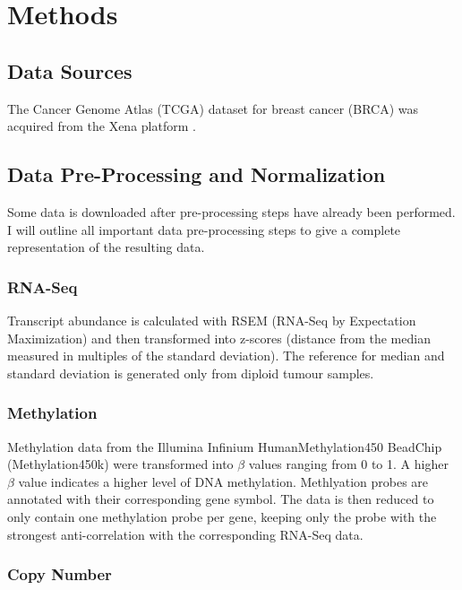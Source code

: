 \section{Methods}
\countem

\subsection{Data Sources}

The Cancer Genome Atlas (TCGA) dataset for breast cancer (BRCA)\cite{Ciriello2015} was acquired from the Xena platform \cite{Goldman2018}.

\subsection{Data Pre-Processing and Normalization}

Some data is downloaded after pre-processing steps have already been performed.
I will outline all important data pre-processing steps to give a complete representation of the resulting data.

\subsubsection*{RNA-Seq}

Transcript abundance is calculated with RSEM (RNA-Seq by Expectation Maximization) and then transformed into z-scores (distance from the median measured in multiples of the standard deviation).
The reference for median and standard deviation is generated only from diploid tumour samples.

\subsubsection*{Methylation}

Methylation data from the Illumina Infinium HumanMethylation450 BeadChip (Methylation450k) were transformed into $\beta$ values ranging from 0 to 1.
A higher $\beta$ value indicates a higher level of DNA methylation.
Methlyation probes are annotated with their corresponding gene symbol.
The data is then reduced to only contain one methylation probe per gene, keeping only the probe with the strongest anti-correlation with the corresponding RNA-Seq data.

\subsubsection*{Copy Number}

